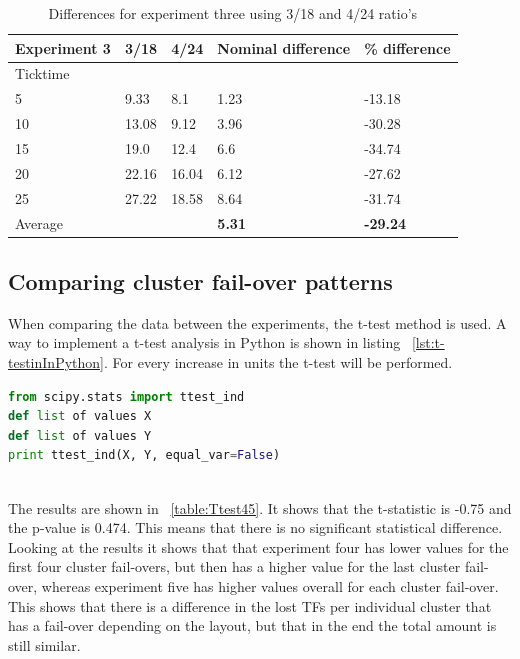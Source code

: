 \begin{table}[!htbp]
\begin{tabular}{| l | l | l | l | l |}
\hline
Experiment 3 & 3/18 & 4/24 & Nominal difference & \% difference \\ \hline
Ticktime &&&& \\ \hline
5 & 9.33 & 8.1 & 1.23 & -13.18 \\ \hline
10 & 13.08 & 9.12 & 3.96 & -30.28 \\ \hline
15 & 19.0 & 12.4 & 6.6 & -34.74 \\ \hline
20 & 22.16 & 16.04 & 6.12 & -27.62 \\ \hline
25 & 27.22 & 18.58 & 8.64 & -31.74 \\ \hline \hline
Average &&& \textbf{5.31} & \textbf{-29.24} \\ \hline
\end{tabular}
\caption{Differences for experiment three using 3/18 and 4/24 ratio's}
\label{table:Diff34ex3}
\end{table}

\newpage

\subsection{Comparing cluster fail-over patterns}
When comparing the data between the experiments, the t-test method is used. A way to implement a t-test analysis in Python is shown in listing ~\ref{lst:t-testinInPython}. For every increase in units the t-test will be performed.

\begin{lstlisting}[frame=single,language=Python,caption={t-test analysis in Python},label={lst:t-testinInPython}]
from scipy.stats import ttest_ind
def list of values X
def list of values Y
print ttest_ind(X, Y, equal_var=False)
\end{lstlisting}

~\\ The results are shown in ~\ref{table:Ttest45}. It shows that the t-statistic is -0.75 and the p-value is 0.474. This means that there is no significant statistical difference. Looking at the results it shows that that experiment four has lower values for the first four cluster fail-overs, but then has a higher value for the last cluster fail-over, whereas experiment five has higher values overall for each cluster fail-over. This shows that there is a difference in the lost TFs per individual cluster that has a fail-over depending on the layout, but that in the end the total amount is still similar.

